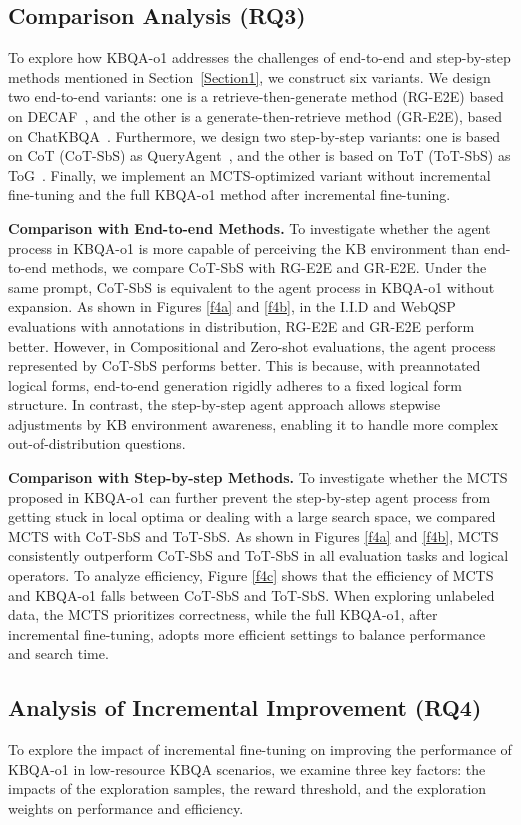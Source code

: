 \documentclass{article}
\theoremstyle{plain}
\theoremstyle{definition}
\theoremstyle{remark}
\begin{document}
\subsection{Comparison Analysis (RQ3)}
\label{Section5.4}
To explore how KBQA-o1 addresses the challenges of end-to-end and step-by-step methods mentioned in Section~\ref{Section1}, we construct six variants.
We design two end-to-end variants: one is a retrieve-then-generate method (RG-E2E) based on DECAF~\cite{DecAF}, and the other is a generate-then-retrieve method (GR-E2E), based on ChatKBQA~\cite{ChatKBQA}. Furthermore, we design two step-by-step variants: one is based on CoT (CoT-SbS) as QueryAgent~\cite{QueryAgent}, and the other is based on ToT (ToT-SbS) as ToG~\cite{ToG}. Finally, we implement an MCTS-optimized variant without incremental fine-tuning and the full KBQA-o1 method after incremental fine-tuning.

\textbf{Comparison with End-to-end Methods. }
To investigate whether the agent process in KBQA-o1 is more capable of perceiving the KB environment than end-to-end methods, we compare CoT-SbS with RG-E2E and GR-E2E. Under the same prompt, CoT-SbS is equivalent to the agent process in KBQA-o1 without expansion.
As shown in Figures \ref{f4a} and \ref{f4b}, in the I.I.D and WebQSP evaluations with annotations in distribution, RG-E2E and GR-E2E perform better. However, in Compositional and Zero-shot evaluations, the agent process represented by CoT-SbS performs better.
This is because, with preannotated logical forms, end-to-end generation rigidly adheres to a fixed logical form structure. In contrast, the step-by-step agent approach allows stepwise adjustments by KB environment awareness, enabling it to handle more complex out-of-distribution questions.

\textbf{Comparison with Step-by-step Methods. }
To investigate whether the MCTS proposed in KBQA-o1 can further prevent the step-by-step agent process from getting stuck in local optima or dealing with a large search space, we compared MCTS with CoT-SbS and ToT-SbS.
As shown in Figures \ref{f4a} and \ref{f4b}, MCTS consistently outperform CoT-SbS and ToT-SbS in all evaluation tasks and logical operators.
To analyze efficiency, Figure \ref{f4c} shows that the efficiency of MCTS and KBQA-o1 falls between CoT-SbS and ToT-SbS. When exploring unlabeled data, the MCTS prioritizes correctness, while the full KBQA-o1, after incremental fine-tuning, adopts more efficient settings to balance performance and search time.

\subsection{Analysis of Incremental Improvement (RQ4)}
\label{Section5.5}
To explore the impact of incremental fine-tuning on improving the performance of KBQA-o1 in low-resource KBQA scenarios, we examine three key factors: the impacts of the exploration samples, the reward threshold, and the exploration weights on performance and efficiency.
\end{document}
